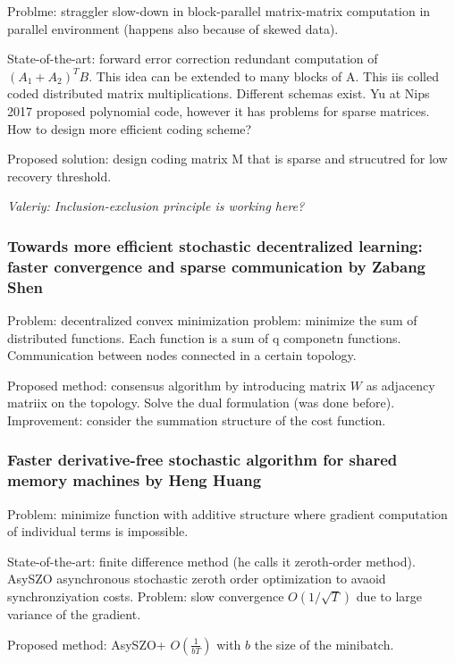 \documentclass[11pt,oneside,a4paper]{scrartcl}
\newcommand{\valeriy}[1]{{\color{blue}\textit{Valeriy: #1}}}
\begin{document}
Problme: straggler slow-down in block-parallel matrix-matrix
computation in parallel environment (happens also because of skewed data).

State-of-the-art: forward error correction  redundant computation of
$(A_1+A_2)^TB$. This idea can be extended to many blocks of A. This
iis colled coded distributed matrix multiplications. Different schemas
exist. Yu at Nips 2017 proposed polynomial code, however it has
problems for sparse matrices. How to design more efficient coding scheme?

Proposed solution: design coding matrix M that is sparse and
strucutred for low recovery threshold. 

\valeriy{Inclusion-exclusion principle is working here?}


\subsubsection{Towards more efficient stochastic decentralized
  learning: faster convergence and sparse communication by Zabang Shen
\cite{shen18a}}
\label{sec:towards-more-effic}

Problem: decentralized convex minimization problem: minimize the sum
of distributed functions. Each function is a sum of q componetn
functions. Communication between nodes connected in a certain
topology.

Proposed method: consensus algorithm by introducing matrix $W$ as
adjacency matriix on the topology.  Solve the dual formulation (was
done before). Improvement: consider the summation structure of the  cost function.




\subsubsection{Faster derivative-free stochastic algorithm for shared
  memory machines by Heng Huang \cite{gu18a}}
\label{sec:fast-deriv-free}

Problem: minimize function with additive structure where gradient
computation of individual terms is impossible.

State-of-the-art: finite difference method (he calls it zeroth-order
method). AsySZO asynchronous stochastic zeroth order optimization to
avaoid synchronziyation costs. Problem: slow convergence
$O(1/\sqrt{T})$ due to large variance of the gradient. 

Proposed method: AsySZO+ $O(\frac{1}{bT})$ with $b$ the size of the
minibatch.
\end{document}

